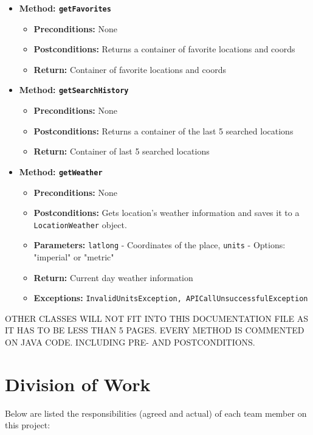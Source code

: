 \documentclass[a4paper,10pt]{article}
\begin{document}
\begin{itemize}
    \item \textbf{Method: \texttt{getFavorites}}
    \begin{itemize}
        \item \textbf{Preconditions:} None
        \item \textbf{Postconditions:} Returns a container of favorite locations and coords
        \item \textbf{Return:} Container of favorite locations and coords
    \end{itemize}
    
    \item \textbf{Method: \texttt{getSearchHistory}}
    \begin{itemize}
        \item \textbf{Preconditions:} None
        \item \textbf{Postconditions:} Returns a container of the last 5 searched locations
        \item \textbf{Return:} Container of last 5 searched locations
    \end{itemize}
    
    \item \textbf{Method: \texttt{getWeather}}
    \begin{itemize}
        \item \textbf{Preconditions:} None
        \item \textbf{Postconditions:} Gets location's weather information and saves it to a \texttt{LocationWeather} object.
        \item \textbf{Parameters:} \texttt{latlong} - Coordinates of the place, \texttt{units} - Options: "imperial" or "metric"
        \item \textbf{Return:} Current day weather information
        \item \textbf{Exceptions:} \texttt{InvalidUnitsException, APICallUnsuccessfulException}
    \end{itemize}
\end{itemize}

OTHER CLASSES WILL NOT FIT INTO THIS DOCUMENTATION FILE AS IT HAS TO BE LESS THAN 5 PAGES. EVERY METHOD IS COMMENTED ON JAVA CODE. INCLUDING PRE- AND POSTCONDITIONS.

\section{Division of Work}

Below are listed the responsibilities (agreed and actual) of each team member on this project:
\end{document}
